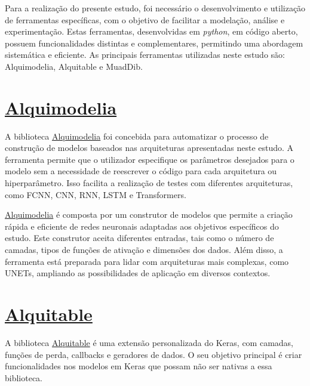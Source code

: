 Para a realização do presente estudo, foi necessário o desenvolvimento e utilização de ferramentas específicas, com o objetivo de facilitar a modelação, análise e experimentação. Estas ferramentas, desenvolvidas em \textit{python}, em código aberto, possuem funcionalidades distintas e complementares, permitindo uma abordagem sistemática e eficiente. As principais ferramentas utilizadas neste estudo são: Alquimodelia, Alquitable e MuadDib. \par


\section{\href{https://github.com/alquimodelia/alquimodelia}{Alquimodelia}\label{se:alquimodelia}}

A biblioteca \href{https://github.com/alquimodelia/alquimodelia}{Alquimodelia} foi concebida para automatizar o processo de construção de modelos baseados nas arquiteturas apresentadas neste estudo. A ferramenta permite que o utilizador especifique os parâmetros desejados para o modelo sem a necessidade de reescrever o código para cada arquitetura ou hiperparâmetro. Isso facilita a realização de testes com diferentes arquiteturas, como \gls{FCNN}, \gls{CNN}, \gls{RNN}, \gls{LSTM} e Transformers. \par
\href{https://github.com/alquimodelia/alquimodelia}{Alquimodelia} é composta por um construtor de modelos que permite a criação rápida e eficiente de redes neuronais adaptadas aos objetivos específicos do estudo. Este construtor aceita diferentes entradas, tais como o número de camadas, tipos de funções de ativação e dimensões dos dados. Além disso, a ferramenta está preparada para lidar com arquiteturas mais complexas, como UNETs, ampliando as possibilidades de aplicação em diversos contextos. \par


\section{\href{https://github.com/alquimodelia/alquitable/blob/main/alquitable}{Alquitable}}

A biblioteca \href{https://github.com/alquimodelia/alquitable/blob/main/alquitable}{Alquitable} é uma extensão personalizada do Keras, com camadas, funções de perda, callbacks e geradores de dados. O seu objetivo principal é criar funcionalidades nos modelos em Keras que possam não ser nativas a essa biblioteca. \par

